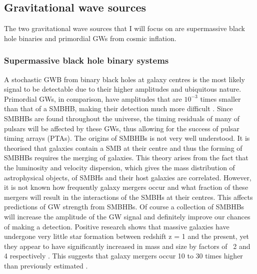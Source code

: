 \documentclass[12pt]{article}
\begin{document}
	\subsection{Gravitational wave sources}\label{GW sources}

The two gravitational wave sources that I will focus on are supermassive black hole binaries and primordial GWs from cosmic inflation.

\subsubsection{Supermassive black hole binary systems}\label{SMBHB source}

\noindent A stochastic GWB from binary black holes at galaxy centres is the most likely signal to be detectable due to their higher amplitudes and ubiquitous nature. Primordial GWs, in comparison, have amplitudes that are $10^{-3}$ times smaller than that of a SMBHB, making their detection much more difficult \cite{arzoumanian2016nanograv}. Since SMBHBs are found throughout the universe, the timing residuals of many of pulsars will be affected by these GWs, thus allowing for the success of pulsar timing arrays (PTAs). The origins of SMBHBs is not very well understood. It is theorised that galaxies contain a SMB at their centre and thus the forming of SMBHBs requires the merging of galaxies. This theory arises from the fact that the luminosity and velocity dispersion, which gives the mass distribution of astrophysical objects, of SMBHs and their host galaxies are correlated. However, it is not known how frequently galaxy mergers occur and what fraction of these mergers will result in the interactions of the SMBHs at their centres. This affects predictions of GW strength from SMBHBs. Of course a collection of SMBHBs will increase the amplitude of the GW signal and definitely improve our chances of making a detection. Positive research shows that massive galaxies have undergone very little star formation between redshift z = 1 and the present, yet they appear to have significantly increased in mass and size by factors of ~2 and 4 respectively \cite{van2012stellar}. This suggests that galaxy mergers occur 10 to 30 times higher than previously estimated \cite{mcwilliams2012imminent}.\\	
\end{document}
